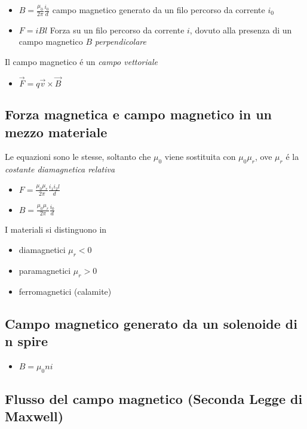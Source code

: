 \documentclass[17pt]{extarticle}
\begin{document}
\begin{itemize}
	\item $B = \frac{\mu_0}{2\pi} \frac{i_0}{d}$ campo magnetico generato da un filo percorso da corrente $i_0$
	\item $F = iBl$ Forza su un filo percorso da corrente $i$, dovuto alla presenza di un campo magnetico $B$ \emph{perpendicolare}
\end{itemize}

Il campo magnetico \'e un \emph{campo vettoriale}

\begin{itemize}
	\item $\vec{F} = q\vec{v}\times\vec{B}$
\end{itemize}

\subsection{Forza magnetica e campo magnetico in un mezzo materiale}

Le equazioni sono le stesse, soltanto che $\mu_0$ viene sostituita con $\mu_0\mu_r$, ove $\mu_r$ \'e la \emph{costante diamagnetica relativa}

\begin{itemize}
	\item $F = \frac{\mu_0\mu_r}{2\pi} \frac{i_1i_2l}{d}$
	\item $B = \frac{\mu_0\mu_r}{2\pi} \frac{i_0}{d}$
\end{itemize}

I materiali si distinguono in
\begin{itemize}
	\item diamagnetici $\mu_r < 0$
	\item paramagnetici $\mu_r > 0$
	\item ferromagnetici (calamite) 
\end{itemize}


\subsection{Campo magnetico generato da un solenoide di n spire}
\begin{itemize}
	\item $B = \mu_0 ni$
\end{itemize}

\subsection{Flusso del campo magnetico (Seconda Legge di Maxwell)}
\end{document}
